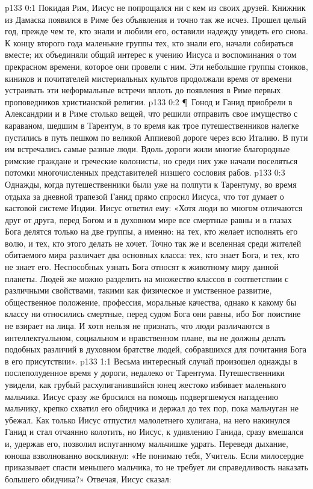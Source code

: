 \author{Комиссия срединников}
\vs p133 0:1 Покидая Рим, Иисус не попрощался ни с кем из своих друзей. Книжник из Дамаска появился в Риме без объявления и точно так же исчез. Прошел целый год, прежде чем те, кто знали и любили его, оставили надежду увидеть его снова. К концу второго года маленькие группы тех, кто знали его, начали собираться вместе; их объединяли общий интерес к учению Иисуса и воспоминания о том прекрасном времени, которое они провели с ним. Эти небольшие группы стоиков, киников и почитателей мистериальных культов продолжали время от времени устраивать эти неформальные встречи вплоть до появления в Риме первых проповедников христианской религии.
\vs p133 0:2 \P\ Гонод и Ганид приобрели в Александрии и в Риме столько вещей, что решили отправить свое имущество с караваном, шедшим в Тарентум, в то время как трое путешественников налегке пустились в путь пешком по великой Аппиевой дороге через всю Италию. В пути им встречались самые разные люди. Вдоль дороги жили многие благородные римские граждане и греческие колонисты, но среди них уже начали поселяться потомки многочисленных представителей низшего сословия рабов.
\vs p133 0:3 Однажды, когда путешественники были уже на полпути к Тарентуму, во время отдыха за дневной трапезой Ганид прямо спросил Иисуса, что тот думает о кастовой системе Индии. Иисус ответил ему: «Хотя люди во многом отличаются друг от друга, перед Богом и в духовном мире все смертные равны и в глазах Бога делятся только на две группы, а именно: на тех, кто желает исполнять его волю, и тех, кто этого делать не хочет. Точно так же и вселенная среди жителей обитаемого мира различает два основных класса: тех, кто знает Бога, и тех, кто не знает его. Неспособных узнать Бога относят к животному миру данной планеты. Людей же можно разделить на множество классов в соответствии с различными свойствами, такими как физическое и умственное развитие, общественное положение, профессия, моральные качества, однако к какому бы классу ни относились смертные, перед судом Бога они равны, ибо Бог поистине не взирает на лица. И хотя нельзя не признать, что люди различаются в интеллектуальном, социальном и нравственном плане, вы не должны делать подобных различий в духовном братстве людей, собравшихся для почитания Бога в его присутствии».
\vs p133 1:1 Весьма интересный случай произошел однажды в послеполуденное время у дороги, недалеко от Тарентума. Путешественники увидели, как грубый расхулиганившийся юнец жестоко избивает маленького мальчика. Иисус сразу же бросился на помощь подвергшемуся нападению мальчику, крепко схватил его обидчика и держал до тех пор, пока мальчуган не убежал. Как только Иисус отпустил малолетнего хулигана, на него накинулся Ганид и стал отчаянно колотить, но Иисус, к удивлению Ганида, сразу вмешался и, удержав его, позволил испуганному мальчишке удрать. Переведя дыхание, юноша взволнованно воскликнул: «Не понимаю тебя, Учитель. Если милосердие приказывает спасти меньшего мальчика, то не требует ли справедливость наказать большего обидчика?» Отвечая, Иисус сказал:

